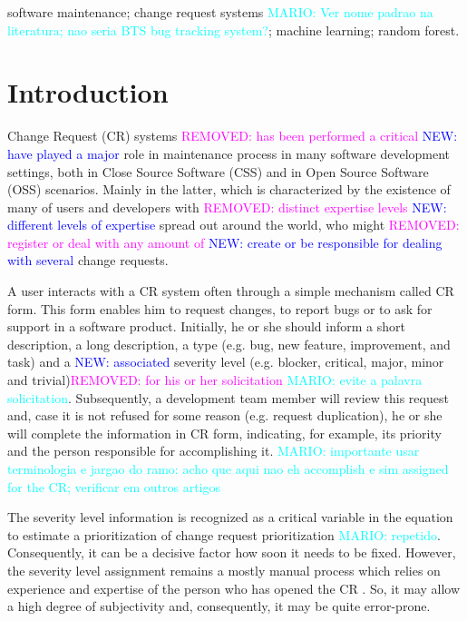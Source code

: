 \documentclass[10pt, conference]{IEEEtran}
\newcommand{\mario}[1]{\noindent\textcolor{cyan}{MARIO: {#1}}}
\newcommand{\rem}[1]{\noindent\textcolor{magenta}{REMOVED: {#1}}}
\newcommand{\new}[1]{\noindent\textcolor{blue}{NEW: {#1}}}
\newcommand{\mario}[1]{}
\newcommand{\rem}[1]{}
\newcommand{\new}[1]{#1}
\begin{document}
\begin{IEEEkeywords}
software maintenance; change request systems \mario{Ver nome padrao na literatura; nao seria BTS bug tracking system?}; machine learning; random forest.
\end{IEEEkeywords}


%
\IEEEpeerreviewmaketitle



\section{Introduction}
Change Request (CR) systems \rem{has been performed a critical} \new{have played a major} role in maintenance process in many software development settings, both in Close Source Software (CSS) and in Open Source Software (OSS) scenarios. Mainly in the latter, which is characterized by the existence of many of users and developers with \rem{distinct expertise levels} \new{different levels of expertise} spread out around the world, who might \rem{register or deal with any amount of} \new{create or be responsible for dealing with several} change requests\cite{Cavalcanti2014}. 

A user interacts with a CR system often through a simple mechanism called CR form. This form enables him to request changes, to report bugs or to ask for support in a software product\cite{Sommerville2010}. Initially, he or she should inform a short description, a long description, a type (e.g. bug, new feature, improvement, and task) and a \new{associated} severity level (e.g. blocker, critical, major, minor and trivial)\rem{ for his or her solicitation} \mario{evite a palavra solicitation}. Subsequently, a development team member will review this request and, case it is not refused for some reason (e.g. request duplication), he or she will complete the information in CR form, indicating, for example, its priority and the person responsible for accomplishing it. \mario{importante usar terminologia e jargao do ramo: acho que aqui nao eh accomplish e sim assigned for the CR; verificar em outros artigos}

The severity level information is recognized as a critical variable in the equation to estimate a prioritization of change request prioritization\cite{Tian2012} \mario{repetido}. Consequently, it can be a decisive factor how soon it needs to be fixed\cite{Lamkanfi2010}. However, the severity level assignment remains a mostly manual process which relies on experience and expertise of the person who has opened the CR \cite{Cavalcanti2014, Tian2012, Lamkanfi2010}. So, it may allow a high degree of subjectivity and, consequently, it may be quite error-prone. 
\end{document}
